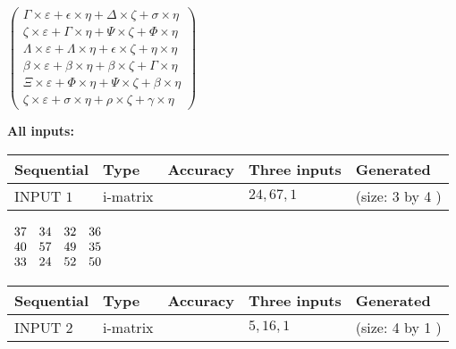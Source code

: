 \documentclass[12pt]{article}
\begin{document}
   
 $   \left( \begin{array}
 {
 c
 }
 \Gamma \times  \varepsilon   +  \epsilon \times  \eta   +  \Delta \times                     \zeta   +  \sigma \times  \eta \\ 
                    \zeta \times  \varepsilon   +  \Gamma \times  \eta   +  \Psi \times                     \zeta   +  \Phi \times  \eta \\ 
 \Lambda \times  \varepsilon   +  \Lambda \times  \eta   +  \epsilon \times                     \zeta   +  \eta \times  \eta \\ 
 \beta \times  \varepsilon   +  \beta \times  \eta   +  \beta \times                     \zeta   +  \Gamma \times  \eta \\ 
                    \Xi \times  \varepsilon   +  \Phi \times  \eta   +  \Psi \times                     \zeta   +  \beta \times  \eta \\ 
                    \zeta \times  \varepsilon   +  \sigma \times  \eta   +  \rho \times                     \zeta   +  \gamma \times  \eta
 \end{array} \right) $ 
   
   
\noindent\vspace{0.1in}\hspace{-0.08in} {\textbf{\Large{All inputs: }}}
   
   
  
  
\noindent\begin{tabular}{|l|l|l|l|l|}
\hline
 Sequential & Type & Accuracy & Three inputs & Generated \\ 
\hline
 
 
  INPUT $  1 $ & i-matrix &  & $
 24
 , 
 67
 , 
 1
 $ & (size:  3  by  4 )
 \\  \hline  
 \end{tabular}
   
   
 $\begin{array}{
 c
 c
 c
 c
 }
 37  & 
 34  & 
 32  & 
 36  \\ 
 40  & 
 57  & 
 49  & 
 35  \\ 
 33  & 
 24  & 
 52  & 
 50
\end{array}  $ 
  
  
\noindent\begin{tabular}{|l|l|l|l|l|}
\hline
 Sequential & Type & Accuracy & Three inputs & Generated \\ 
\hline
 
 
  INPUT $  2 $ & i-matrix &  & $
 5
 , 
 16
 , 
 1
 $ & (size:  4  by  1 )
 \\  \hline  
 \end{tabular}
   
\end{document}
